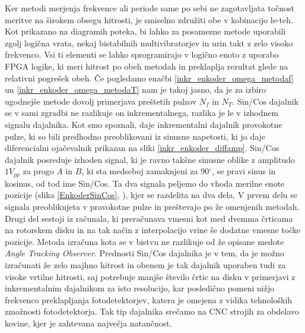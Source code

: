 \documentclass[a4paper,twoside,openright,12pt]{book}
\begin{document}
Ker metodi merjenja frekvence ali periode same po sebi ne zagotavljata točnost meritve na širokem obsegu hitrosti, je smiselno združiti obe v kobinacijo le-teh. Kot prikazano na diagramih poteka, bi lahko za posamezne metode uporabili zgolj logična vrata, nekaj bistabilnih multivibratorjev in urin takt z zelo visoko frekvenco. Vsi ti elementi se lahko sprogramirajo v logično enoto z uporabo FPGA logike, ki meri hitrost po obeh metodah in preklaplja rezultat glede na relativni pogrešek obeh. Če pogledamo enačbi \ref{inkr_enkoder_omega_metodaf} un \ref{inkr_enkoder_omega_metodaT} nam je takoj jasno, da je za izbiro ugodnejše metode dovolj primerjava preštetih pulzov $N_f$ in $N_T$.
Sin/Cos dajalnik se v sami zgradbi ne razlikuje on inkrementalnega, razlika je le v izhodnem signalu dajalnika. Kot smo spoznali, daje inkrementalni dajalnik provokotne pulze, ki so bili predhodno preoblikovani iz sinusne napetosti, ki jo daje diferencialni ojačevalnik prikazan na sliki \ref{inkr_enkoder_diffamp}. Sin/Cos dajalnik posreduje izhoden signal, ki je ravno takšne sinusne oblike z amplitudo $1V_{pp}$ za progo $A$ in $B$, ki sta medseboj zamaknjeni za 90$^\circ$, se pravi sinus in kosinus, od tod ime Sin/Cos. Ta dva signala peljemo do vhoda merilne enote pozicije (slika \ref{EnkoderSinCos}, \cite{schmirgel2009fpga}), kjer se razdelita na dva dela. V prvem delu se signala preoblikujeta v pravokotne pulze in preštevajo po že omenjenih metodah. Drugi del sestoji iz računala, ki preračunava vmesni kot med dvemma črticama na rotorskem disku in na tak način z interpolacijo vrine še dodatne vmesne točke pozicije. Metoda izračuna kota se v bistvu ne razlikuje od že opisane medote  \textit{Angle Tracking Observer}. Prednosti Sin/Cos dajalnika je v tem, da je možno izračunati že zelo majhno hitrost in obenem je tak dajalnik uporaben tudi za visoke vrtilne hitrosti, saj potrebuje manjše število črtic na disku v primerjavi z inkrementalnim dajalnikom za isto resolucijo, kar posledično pomeni nižjo frekvenco preklapljanja fotodetektorjev, katera je omejena z vidika tehnoloških zmožnosti fotodetektorja. Tak tip dajalnika srečamo na CNC strojih za obdelavo kovine, kjer je zahtevana največja natančnost.
\end{document}
